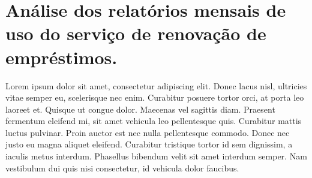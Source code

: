{\let\clearpage\relax \chapter{\textnormal{Análise dos
	  relatórios mensais de uso do serviço de renovação de empréstimos.}}}

Lorem ipsum dolor sit amet, consectetur adipiscing elit. Donec lacus nisl,
ultricies vitae semper eu, scelerisque nec enim. Curabitur posuere tortor orci,
at porta leo laoreet et. Quisque ut congue dolor. Maecenas vel sagittis diam.
Praesent fermentum eleifend mi, sit amet vehicula leo pellentesque quis.
Curabitur mattis luctus pulvinar. Proin auctor est nec nulla pellentesque
commodo. Donec nec justo eu magna aliquet eleifend. Curabitur tristique tortor
id sem dignissim, a iaculis metus interdum. Phasellus bibendum velit sit amet
interdum semper. Nam vestibulum dui quis nisi consectetur, id vehicula dolor
faucibus.\\